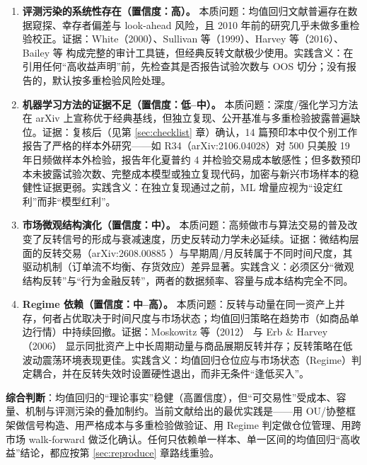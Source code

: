 \begin{enumerate}
  \item \textbf{评测污染的系统性存在（置信度：高）。} 本质问题：均值回归文献普遍存在数据窥探、幸存者偏差与 look-ahead 风险，且 2010 年前的研究几乎未做多重检验校正。证据：White（2000）\cite{white2000}、Sullivan 等（1999）\cite{sullivan1999}、Harvey 等（2016）\cite{harveylz2016}、Bailey 等 \cite{bailey2014pbo,bailey2014dsr} 构成完整的审计工具链，但经典反转文献极少使用。实践含义：在引用任何“高收益声明”前，先检查其是否报告试验次数与 OOS 切分；没有报告的，默认按多重检验风险处理。

  \item \textbf{机器学习方法的证据不足（置信度：低--中）。} 本质问题：深度/强化学习方法在 arXiv 上宣称优于经典基线，但独立复现、公开基准与多重检验披露普遍缺位。证据：复核后（见第 \ref{sec:checklist} 章）确认，14 篇预印本中仅个别工作报告了严格的样本外研究——如 R34（arXiv:2106.04028）对 500 只美股 19 年日频做样本外检验，报告年化夏普约 4 并检验交易成本敏感性；但多数预印本未披露试验次数、完整成本模型或独立复现代码，加密与新兴市场样本的稳健性证据更弱。实践含义：在独立复现通过之前，ML 增量应视为“设定红利”而非“模型红利”。

  \item \textbf{市场微观结构演化（置信度：中）。} 本质问题：高频做市与算法交易的普及改变了反转信号的形成与衰减速度，历史反转动力学未必延续。证据：微结构层面的反转交易（arXiv:2608.00885 \cite{arxiv_microstructure}）与早期周/月反转属于不同时间尺度，其驱动机制（订单流不均衡、存货效应）差异显著。实践含义：必须区分“微观结构反转”与“行为金融反转”，两者的数据频率、容量与成本结构完全不同。

  \item \textbf{Regime 依赖（置信度：中--高）。} 本质问题：反转与动量在同一资产上并存，何者占优取决于时间尺度与市场状态；均值回归策略在趋势市（如商品单边行情）中持续回撤。证据：Moskowitz 等（2012）\cite{mom2012} 与 Erb \& Harvey（2006）\cite{erbharvey2006} 显示同批资产上中长周期动量与商品展期反转并存；反转策略在低波动震荡环境表现更佳。实践含义：均值回归仓位应与市场状态（Regime）判定耦合，并在反转失效时设置硬性退出，而非无条件“逢低买入”。
\end{enumerate}

\noindent\textbf{综合判断}：均值回归的“理论事实”稳健（高置信度），但“可交易性”受成本、容量、机制与评测污染的叠加制约。当前文献给出的最优实践是——用 OU/协整框架做信号构造、用严格成本与多重检验做验证、用 Regime 判定做仓位管理、用跨市场 walk-forward 做泛化确认。任何只依赖单一样本、单一区间的均值回归“高收益”结论，都应按第 \ref{sec:reproduce} 章路线重验。
